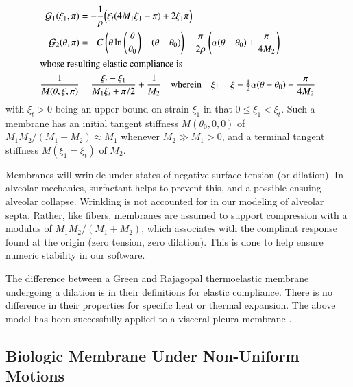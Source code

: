\begin{subequations} 
    \label{uniformMembrane}
    \begin{align}
    \mathcal{G}_1 (\xi_1 , \pi) & = - \frac{1}{\rho} 
    \Bigl( \xi_t (4M_1 \xi_1 - \pi ) + 2 \xi_1 \pi \Bigr) \\
    \mathcal{G}_2 (\theta , \pi) & = -C \left( \theta \ln \left( \frac{\theta}{\theta_0} \right) -
    (\theta - \theta_0) \right) - \frac{\pi}{2\rho} \left( 
    \alpha ( \theta - \theta_0 ) + \frac{\pi}{4M_2} \right) \\
    \intertext{whose resulting elastic compliance is}
    \frac{1}{M(\theta, \xi, \pi)} & = 
    \frac{\xi_t - \xi_1}{M_1 \xi_t + \pi / 2} + \frac{1}{M_2} 
    \quad \text{wherein} \quad 
    \xi_1 = \xi - \tfrac{1}{2} \alpha (\theta - \theta_0) - \frac{\pi}{4M_2}
    \label{membraneCompliance}
    \end{align}
\end{subequations}
with $\xi_t > 0$ being an upper bound on strain $\xi_1$ in that $0 \leq \xi_1 < \xi_t$.  Such a membrane has an initial tangent stiffness $M(\theta_0, 0, 0)$ of $M_1 M_2 / ( M_1 + M_2 ) \approx M_1$ whenever $M_2 \gg M_1 > 0$, and a terminal tangent stiffness $M(\xi_1 \! = \! \xi_t)$ of $M_2$.  

Membranes will wrinkle under states of negative surface tension (or dilation).  In alveolar mechanics, surfactant helps to prevent this, and a possible ensuing alveolar collapse.  Wrinkling is not accounted for in our modeling of alveolar septa.  Rather, like fibers, membranes are assumed to support compression with a modulus of $M_1 M_2 / ( M_1 + M_2 )$, which associates with the compliant response found at the origin (zero tension, zero dilation).  This is done to help ensure numeric stability in our software.

The difference between a Green and Rajagopal thermo\-elastic membrane undergoing a dilation is in their definitions for elastic compliance.  There is no difference in their properties for specific heat or thermal expansion.  The above model has been successfully applied to a visceral pleura membrane \cite{Freedetal17}.

\subsection{Biologic Membrane Under Non-Uniform Motions}

